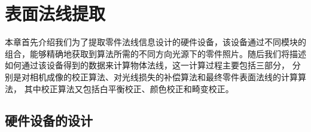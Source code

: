 
\chapter{表面法线提取}

本章首先介绍我们为了提取零件法线信息设计的硬件设备，该设备通过不同模块的组合，能够精确地获取到算法所需的不同方向光源下的零件照片。随后我们将描述如何通过该设备得到的数据来计算物体法线，这一计算过程主要包括三部分，
分别是对相机成像的校正算法、对光线损失的补偿算法和最终零件表面法线的计算算法，
其中校正算法又包括白平衡校正、颜色校正和畸变校正。

\section{硬件设备的设计}
\label{section:yingjianshebeidesheji}

